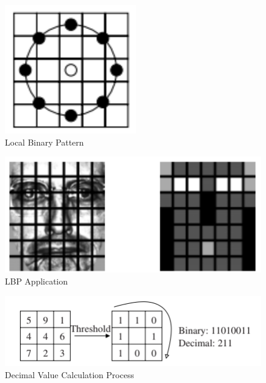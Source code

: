 \documentclass[
]{article}
\begin{document}
\begin{figure}[htbp]
  \centering
  \includegraphics[width=0.4\linewidth]{images/lbph.png}
  \caption{Local Binary Pattern}
\end{figure}

\begin{figure}[htbp]
  \centering
  \includegraphics[width=0.4\linewidth]{images/lbph_1.png}
  \caption{LBP Application}
\end{figure}

\begin{figure}[htbp]
  \centering
  \includegraphics[width=0.4\linewidth]{images/lbph_2.png}
  \caption{Decimal Value Calculation Process}
\end{figure}



\end{document}
